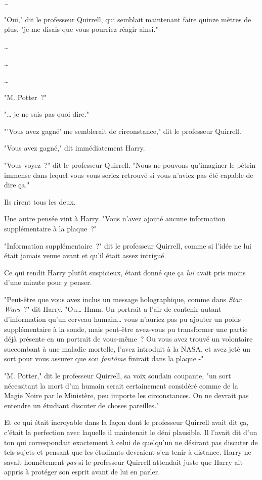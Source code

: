 …

"Oui," dit le professeur Quirrell, qui semblait maintenant faire quinze mètres de plus, "je me disais que vous pourriez réagir ainsi."

…

…

…

"M. Potter~?"

"… je ne sais pas quoi dire."

"'Vous avez gagné' me semblerait de circonstance," dit le professeur Quirrell.

"Vous avez gagné," dit immédiatement Harry.

"Vous voyez~?" dit le professeur Quirrell. "Nous ne pouvons qu'imaginer le pétrin immense dans lequel vous vous seriez retrouvé si vous n'aviez pas été capable de dire ça."

Ils rirent tous les deux.

Une autre pensée vint à Harry. "Vous n'avez ajouté aucune information supplémentaire à la plaque~?"

"Information supplémentaire~?" dit le professeur Quirrell, comme si l'idée ne lui était jamais venue avant et qu'il était assez intrigué.

Ce qui rendit Harry plutôt suspicieux, étant donné que ça \emph{lui} avait pris moins d'une minute pour y penser.

"Peut-être que vous avez inclus un message holographique, comme dans \emph{Star Wars}~?" dit Harry. "Ou… Hmm. Un portrait a l'air de contenir autant d'information qu'un cerveau humain… vous n'auriez pas pu ajouter un poids supplémentaire à la sonde, mais peut-être avez-vous pu transformer une partie déjà présente en un portrait de vous-même~? Ou vous avez trouvé un volontaire succombant à une maladie mortelle, l'avez introduit à la NASA, et avez jeté un sort pour vous assurer que son \emph{fantôme} finirait dans la plaque -"

"M. Potter," dit le professeur Quirrell, sa voix soudain coupante, "un sort nécessitant la mort d'un humain serait certainement considéré comme de la Magie Noire par le Ministère, peu importe les circonstances. On ne devrait pas entendre un étudiant discuter de choses pareilles."

Et ce qui était incroyable dans la façon dont le professeur Quirrell avait dit ça, c'était la perfection avec laquelle il maintenait le déni plausible. Il l'avait dit d'un ton qui correspondait exactement à celui de quelqu'un ne désirant pas discuter de tels sujets et pensant que les étudiants devraient s'en tenir à distance. Harry ne savait honnêtement \emph{pas} si le professeur Quirrell attendait juste que Harry ait appris à protéger son esprit avant de lui en parler.

